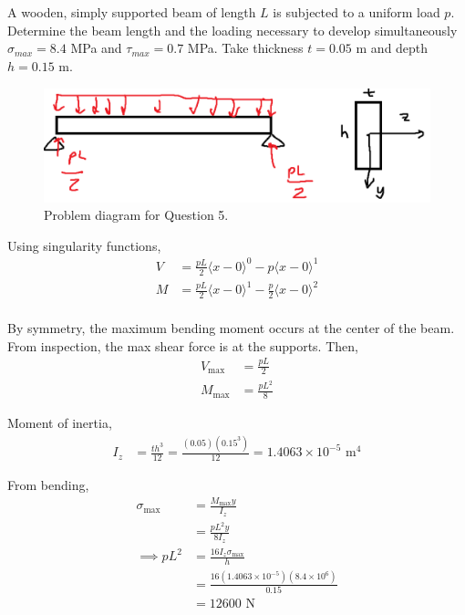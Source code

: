 \section{}

A wooden, simply supported beam of length $L$ is subjected to a uniform load $p$. Determine the
beam length and the loading necessary to develop simultaneously $\sigma_{max} = 8.4$ MPa and $\tau_{max} =
0.7$ MPa. Take thickness $t = 0.05$ m and depth $h = 0.15$ m.

\begin{figure}
    \centering
    \includegraphics[width=0.35\linewidth]{Questions/Figures/Q5ProblemDiagram.png}
    \caption{Problem diagram for Question 5.}
\end{figure}

Using singularity functions, 
\begin{align*}
    V &= \frac{pL}{2} \langle x - 0 \rangle^{0} - p \langle x - 0 \rangle^{1} \\
    M & = \frac{pL}{2} \langle x - 0 \rangle^{1} - \frac{p}{2} \langle x - 0 \rangle^{2} \\
\end{align*}

By symmetry, the maximum bending moment occurs at the center of the beam. From inspection, the max shear force is at the supports. Then,
\begin{align*}
    V_{\max} &= \frac{pL}{2} \\
    M_{\max} &= \frac{pL^2}{8}
\end{align*}

Moment of inertia,
\begin{align*}
    I_z &= \frac{th^3}{12} = \frac{(0.05)(0.15^3)}{12} = 1.4063\times 10^{-5} \text{ m}^4
\end{align*}

From bending,
\begin{align*}
    \sigma_{\max} &= \frac{M_{\max} y}{I_z} \\
    &= \frac{pL^2 y}{8 I_z} \\
    \implies pL^2 &= \frac{16 I_z \sigma_{\max}}{h} \\
    &= \frac{16 (1.4063\times 10^{-5}) (8.4\times 10^6)}{0.15} \\
    &= 12600 \text{ N}
\end{align*}

